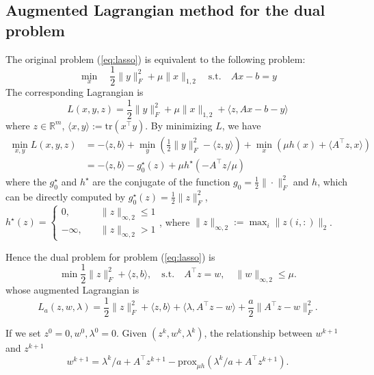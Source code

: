 \documentclass{article}
\numberwithin{equation}{section}
\numberwithin{figure}{section}
\begin{document}
\subsection{Augmented Lagrangian method for the dual problem}
The original problem (\ref{eq:lasso}) is equivalent to the following problem:
\begin{equation}
    \min_x\quad \frac{1}{2}\|y\|_F^2+\mu \|x\|_{1,2}\quad \mathrm{s.t.}\quad Ax-b = y
\end{equation}
The corresponding Lagrangian is
\begin{equation}
    L(x,y,z) = \frac{1}{2}\|y\|_F^2+\mu \|x\|_{1,2} +\langle z,Ax-b-y\rangle
\end{equation}
where $z\in \mathbb{R}^m$, $\langle x,y\rangle:=\mathrm{tr}(x^\top y)$.
By minimizing $L$, we have
\begin{equation}
\begin{split}
        \min_{x,y}L(x,y,z) &= -\langle z,b\rangle+\min_y(\frac{1}{2}\|y\|_F^2-\langle z, y\rangle) +\min_x(\mu h(x)+\langle A^\top z, x\rangle)\\
        &= -\langle z,b\rangle-g_0^\star(z)+\mu h^\star(-A^\top z/\mu)
\end{split}
\end{equation}
where the $g_0^\star$ and $h^\star$ are the conjugate of the function $g_0=\frac{1}{2}\|\cdot\|_F^2$ and $h$, which can be directly computed by $g_0^\star(z) = \frac{1}{2}\|z\|^2_F$, $h^\star(z)=\begin{cases}0,\quad & \|z\|_{\infty,2}\leq 1\\ -\infty,\quad &\|z\|_{\infty,2}> 1\end{cases}$, where $\|z\|_{\infty,2}:=\max_i \|z(i,:)\|_2$.

Hence the dual problem for problem (\ref{eq:lasso}) is
\begin{equation}
    \min \frac{1}{2}\|z\|_F^2+\langle z,b\rangle,\quad \mathrm{s.t.}\quad A^\top z=w,\quad \|w\|_{\infty,2}\leq \mu.
\end{equation}
whose augmented Lagrangian is
\begin{equation}
\label{eq:dualaugLag}
    L_a(z,w,\lambda)=\frac{1}{2}\|z\|_F^2+\langle z,b\rangle+\langle\lambda,A^\top z-w\rangle+\frac{a}{2}\|A^\top z-w\|_F^2.
\end{equation}

If we set $z^0=0,w^0,\lambda^0=0$. Given $(z^k,w^k,\lambda^k)$, the relationship between $w^{k+1}$ and $z^{k+1}$
\begin{equation}
    w^{k+1}=\lambda^k/a+A^\top z^{k+1}-\mathrm{prox}_{\mu h }(\lambda^k/a+A^\top z^{k+1}).
\end{equation}
\end{document}
